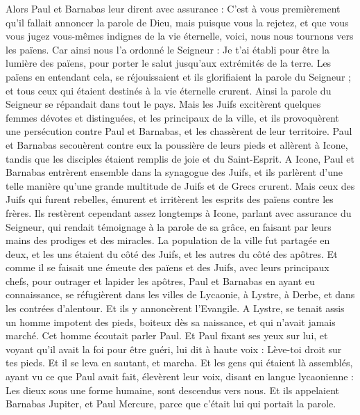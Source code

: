 \begin{multicols}{2}
Alors Paul et Barnabas leur dirent avec assurance : C’est à vous premièrement qu'il fallait annoncer la parole de Dieu, mais puisque vous la rejetez, et que vous vous jugez vous-mêmes indignes de la vie éternelle, voici, nous nous tournons vers les païens.
Car ainsi nous l’a ordonné le Seigneur : Je t'ai établi pour être la lumière des païens, pour porter le salut jusqu’aux extrémités de la terre.
Les païens en entendant cela, se réjouissaient et ils glorifiaient la parole du Seigneur ; et tous ceux qui étaient destinés à la vie éternelle crurent.
Ainsi la parole du Seigneur se répandait dans tout le pays.
Mais les Juifs excitèrent quelques femmes dévotes et distinguées, et les principaux de la ville, et ils provoquèrent une persécution contre Paul et Barnabas, et les chassèrent de leur territoire.
Paul et Barnabas secouèrent contre eux la poussière de leurs pieds et allèrent à Icone,
tandis que les disciples étaient remplis de joie et du Saint-Esprit.
\VerseOne{}A Icone, Paul et Barnabas entrèrent ensemble dans la synagogue des Juifs, et ils parlèrent d'une telle manière qu'une grande multitude de Juifs et de Grecs crurent.
Mais ceux des Juifs qui furent rebelles, émurent et irritèrent les esprits des païens contre les frères.
Ils restèrent cependant assez longtemps à Icone, parlant avec assurance du Seigneur, qui rendait témoignage à la parole de sa grâce, en faisant par leurs mains des prodiges et des miracles.
La population de la ville fut partagée en deux, et les uns étaient du côté des Juifs, et les autres du côté des apôtres.
Et comme il se faisait une émeute des païens et des Juifs, avec leurs principaux chefs, pour outrager et lapider les apôtres,
Paul et Barnabas en ayant eu connaissance, se réfugièrent dans les villes de Lycaonie, à Lystre, à Derbe, et dans les contrées d'alentour.
Et ils y annoncèrent l'Evangile.
A Lystre, se tenait assis un homme impotent des pieds, boiteux dès sa naissance, et qui n'avait jamais marché.
Cet homme écoutait parler Paul. Et Paul fixant ses yeux sur lui, et voyant qu'il avait la foi pour être guéri,
lui dit à haute voix : Lève-toi droit sur tes pieds. Et il se leva en sautant, et marcha.
Et les gens qui étaient là assemblés, ayant vu ce que Paul avait fait, élevèrent leur voix, disant en langue lycaonienne : Les dieux sous une forme humaine, sont descendus vers nous.
Et ils appelaient Barnabas Jupiter, et Paul Mercure, parce que c'était lui qui portait la parole.

\end{multicols}
